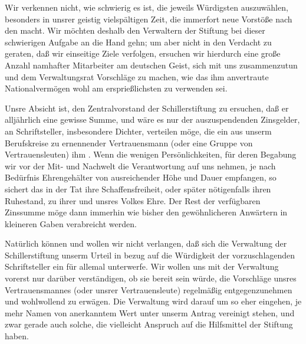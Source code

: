 \pstart
           Wir verkennen nicht, wie schwierig es ist, die jeweils Würdigsten auszuwählen,
               besonders in unsrer geistig vielspältigen Zeit, die immerfort neue Vorstöße nach den
                   macht. Wir möchten deshalb
               den Verwaltern der Stiftung bei
               dieser schwierigen Aufgabe an die Hand gehn; um aber nicht in den Verdacht zu
               geraten, daß wir einseitige Ziele verfolgen, ersuchen wir hierdurch eine große Anzahl
               namhafter Mitarbeiter am deutschen Geist, sich mit uns zusammenzutun und dem
               Verwaltungsrat Vorschläge zu {\pb}machen, wie das ihm
               anvertraute Nationalvermögen wohl am ersprießlichsten zu verwenden sei.\pend
           
\pstart
           Unsre Absicht ist, den Zentralvorstand der Schillerstiftung zu ersuchen, daß er alljährlich eine gewisse Summe, und
               wäre es nur  der auszuspendenden Zinsgelder, an
                   Schriftsteller, insbesondere Dichter,
               verteilen möge, die ein aus unserm Berufskreise zu ernennender Vertrauensmann (oder
               eine Gruppe von Vertrauensleuten) ihm . Wenn die wenigen Persönlichkeiten, für deren Begabung wir vor der Mit-
               und Nachwelt die Verantwortung auf uns nehmen, je nach Bedürfnis Ehrengehälter von
               ausreichender Höhe und Dauer empfangen, so sichert das in der Tat ihre
               Schaffensfreiheit, oder später nötigenfalls ihren Ruhestand, zu ihrer und unsres
               Volkes Ehre. Der Rest der verfügbaren Zinssumme möge dann immerhin wie bisher den
               gewöhnlicheren Anwärtern in kleineren Gaben verabreicht werden.\pend
           
\pstart
           Natürlich können und wollen wir nicht verlangen, daß sich die Verwaltung der Schillerstiftung unserm Urteil in bezug auf die
               Würdigkeit der vorzuschlagenden Schriftsteller ein für allemal unterwerfe. Wir wollen
               uns mit der Verwaltung vorerst nur darüber verständigen, ob sie  bereit sein würde, die Vorschläge unsres Vertrauensmannes
               (oder unsrer Vertrauensleute) regelmäßig entgegenzunehmen und wohlwollend zu erwägen.
               Die Verwaltung wird darauf um so eher eingehen, je mehr Namen von anerkanntem Wert
               unter unserm Antrag vereinigt stehen, und zwar gerade auch solche, die vielleicht
               Anspruch auf die Hilfsmittel der Stiftung haben.\pend
           
